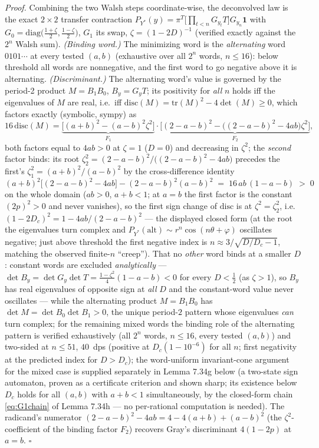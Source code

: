 \documentclass[
]{article}
\begin{document}
\emph{Proof.} Combining the two Walsh steps coordinate-wise, the deconvolved
law is the exact $2\times2$ transfer contraction
$P_{Y^*}(y)=\pi^T\bigl[\prod_{t<n}G_{y_t}T\bigr]G_{y_n}\mathbf 1$ with
$G_0=\mathrm{diag}\bigl(\tfrac{1+\zeta}2,\tfrac{1-\zeta}2\bigr)$,
$G_1$ its swap, $\zeta=(1-2D)^{-1}$ (verified exactly against the $2^n$
Walsh sum). \emph{(Binding word.)} The minimizing word is the
\emph{alternating} word $0101\cdots$ at every tested $(a,b)$ (exhaustive over
all $2^n$ words, $n\le16$): below threshold all words are nonnegative, and
the first word to go negative above it is alternating. \emph{(Discriminant.)}
The alternating word's value is governed by the period-2 product
$M=B_1B_0$, $B_y=G_yT$; its positivity for \emph{all} $n$ holds iff the
eigenvalues of $M$ are real, i.e.\ iff
$\mathrm{disc}(M)=\mathrm{tr}(M)^2-4\det(M)\ge0$, which factors exactly
(symbolic, sympy) as
\[
  16\,\mathrm{disc}(M)=\underbrace{\bigl[(a+b)^2-(a-b)^2\zeta^2\bigr]}_{F_1}
  \cdot\underbrace{\bigl[(2-a-b)^2-\bigl((2-a-b)^2-4ab\bigr)\zeta^2\bigr]}_{F_2},
\]
both factors equal to $4ab>0$ at $\zeta=1$ ($D=0$) and decreasing in
$\zeta^2$; the \emph{second} factor binds: its root
$\zeta_2^2=(2-a-b)^2/\bigl((2-a-b)^2-4ab\bigr)$ precedes the first's
$\zeta_1^2=(a+b)^2/(a-b)^2$ by the cross-difference identity
\[
  (a+b)^2\bigl[(2-a-b)^2-4ab\bigr]-(2-a-b)^2(a-b)^2\;=\;16\,ab\,(1-a-b)\;>\;0
\]
on the whole domain ($ab>0$, $a+b<1$; at $a=b$ the first factor is the
constant $(2p)^2>0$ and never vanishes), so the first sign change of
$\mathrm{disc}$ is at $\zeta^2=\zeta_2^2$, i.e.\
$(1-2D_c)^2=1-4ab/(2-a-b)^2$ --- the displayed closed form
(at the root the eigenvalues turn complex and $P_{Y^*}(\mathrm{alt})\sim
r^n\cos(n\theta+\varphi)$ oscillates negative; just above threshold the
first negative index is $n\approx3/\sqrt{D/D_c-1}$, matching the observed
finite-$n$ ``creep''). That no \emph{other} word binds at a smaller $D$:
constant words are excluded \emph{analytically} ---
$\det B_y=\det G_y\det T=\tfrac{1-\zeta^2}4(1-a-b)<0$ for every $D<\tfrac12$
(as $\zeta>1$), so $B_y$ has real eigenvalues of opposite sign at \emph{all}
$D$ and the constant-word value never oscillates --- while the alternating
product $M=B_1B_0$ has $\det M=\det B_0\det B_1>0$, the unique period-$2$
pattern whose eigenvalues \emph{can} turn complex; for the remaining mixed
words the binding role of the alternating pattern is verified exhaustively
(all $2^n$ words, $n\le16$, every tested $(a,b)$) and two-sided at
$n\le51$, $40$~dps (positive at $D_c(1-10^{-6})$ for all $n$; first
negativity at the predicted index for $D>D_c$); the word-uniform
invariant-cone argument for the mixed case is supplied separately in
Lemma 7.34g below (a two-state sign automaton, proven as a certificate
criterion and shown sharp; its existence below $D_c$ holds for all
$(a,b)$ with $a+b<1$ simultaneously, by the closed-form chain
\eqref{eq:G1chain} of Lemma 7.34h --- no per-rational computation is
needed). The radicand's
numerator $(2-a-b)^2-4ab=4-4(a+b)+(a-b)^2$ (the $\zeta^2$-coefficient of
the binding factor $F_2$) recovers Gray's discriminant $4(1-2p)$ at
$a=b$. \hfill$\square$
\end{document}
